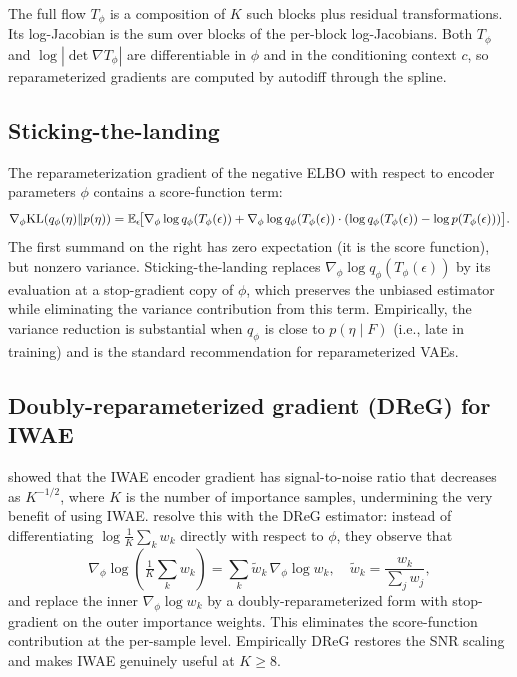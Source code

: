 The full flow $T_\phi$ is a composition of $K$ such blocks plus residual transformations. Its log-Jacobian is the sum over blocks of the per-block log-Jacobians. Both $T_\phi$ and $\log|\det\nabla T_\phi|$ are differentiable in $\phi$ and in the conditioning context $c$, so reparameterized gradients are computed by autodiff through the spline.

\subsection*{Sticking-the-landing}
The reparameterization gradient of the negative ELBO with respect to encoder parameters $\phi$ contains a score-function term:
\begin{equation}
\nabla_\phi\mathrm{KL}(q_\phi(\eta)\|p(\eta)) = \mathbb{E}_\epsilon\!\big[\nabla_\phi\log q_\phi(T_\phi(\epsilon)) + \nabla_\phi\log q_\phi(T_\phi(\epsilon))\cdot(\log q_\phi(T_\phi(\epsilon))-\log p(T_\phi(\epsilon)))\big].
\end{equation}
The first summand on the right has zero expectation (it is the score function), but nonzero variance. Sticking-the-landing \citep{roeder2017stl} replaces $\nabla_\phi\log q_\phi(T_\phi(\epsilon))$ by its evaluation at a stop-gradient copy of $\phi$, which preserves the unbiased estimator while eliminating the variance contribution from this term. Empirically, the variance reduction is substantial when $q_\phi$ is close to $p(\eta\mid F)$ (i.e., late in training) and is the standard recommendation for reparameterized VAEs.

\subsection*{Doubly-reparameterized gradient (DReG) for IWAE}
\citet{rainforth2018iwaeSNR} showed that the IWAE encoder gradient has signal-to-noise ratio that decreases as $K^{-1/2}$, where $K$ is the number of importance samples, undermining the very benefit of using IWAE. \citet{tucker2019dreg} resolve this with the DReG estimator: instead of differentiating $\log\frac{1}{K}\sum_k w_k$ directly with respect to $\phi$, they observe that
\begin{equation}
\nabla_\phi\log\!\left(\tfrac{1}{K}\sum_k w_k\right) = \sum_k \tilde w_k\,\nabla_\phi\log w_k,\quad \tilde w_k=\frac{w_k}{\sum_j w_j},
\end{equation}
and replace the inner $\nabla_\phi\log w_k$ by a doubly-reparameterized form with stop-gradient on the outer importance weights. This eliminates the score-function contribution at the per-sample level. Empirically DReG restores the SNR scaling and makes IWAE genuinely useful at $K\ge 8$.

